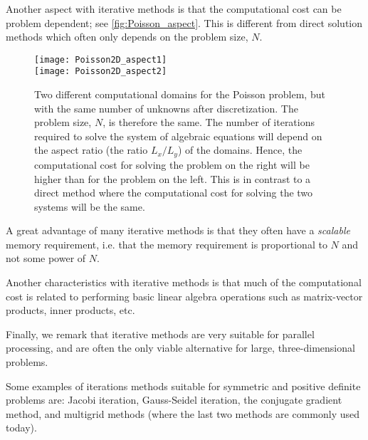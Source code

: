 Another aspect with iterative methods is that the computational cost can be
problem dependent; see \autoref{fig:Poisson_aspect}. This is different from
direct solution methods which often only depends on the problem size, $N$.

\begin{figure}
  \centering
  \texttt{[image: Poisson2D\_aspect1]} \\
  \texttt{[image: Poisson2D\_aspect2]}
  \caption{
    Two different computational domains for the Poisson problem, but with the
    same number of unknowns after discretization. The problem size, $N$, is
    therefore the same. The number of iterations required to solve the system of
    algebraic equations will depend on the aspect ratio (the ratio $L_x/L_y$) of
    the domains. Hence, the computational cost for solving the problem on the
    right will be higher than for the problem on the left. This is in contrast
    to a direct method where the computational cost for solving the two systems
    will be the same.
  }
  \label{fig:Poisson_aspect}
\end{figure}

A great advantage of many iterative methods is that they often have a
\emph{scalable} memory requirement, i.e. that the memory requirement is
proportional to $N$ and not some power of $N$.

Another characteristics with iterative methods is that much of the computational
cost is related to performing basic linear algebra operations such as
matrix-vector products, inner products, etc.

Finally, we remark that iterative methods are very suitable for parallel
processing, and are often the only viable alternative for large,
three-dimensional problems.

Some examples of iterations methods suitable for symmetric and positive definite
problems are: Jacobi iteration, Gauss-Seidel iteration, the conjugate gradient
method, and multigrid methods (where the last two methods are commonly used
today).
